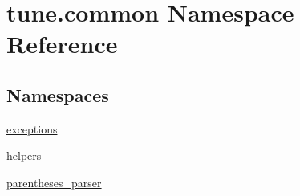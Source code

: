 \hypertarget{namespacetune_1_1common}{\section{tune.\-common Namespace Reference}
\label{namespacetune_1_1common}
}
\subsection*{Namespaces}
\begin{DoxyCompactItemize}
\item 
\hyperlink{namespacetune_1_1common_1_1exceptions}{exceptions}
\item 
\hyperlink{namespacetune_1_1common_1_1helpers}{helpers}
\item 
\hyperlink{namespacetune_1_1common_1_1parentheses__parser}{parentheses\-\_\-parser}
\end{DoxyCompactItemize}
